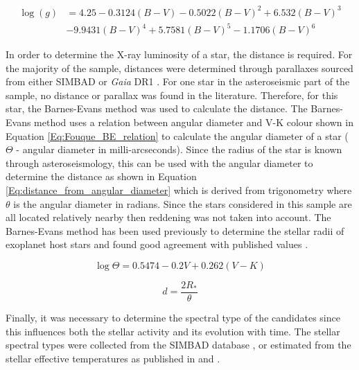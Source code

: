 \begin{equation}
    \begin{aligned}
    \log(g) & = 4.25 - 0.3124(B-V) - 0.5022(B-V)^{2} + 6.532(B-V)^{3} \\
    &- 9.9431(B-V)^{4} + 5.7581(B-V)^{5} - 1.1706(B-V)^{6}
    \label{Eq:Gray_2005}
    \end{aligned}
\end{equation}

In order to determine the X-ray luminosity of a star, the distance is required. For the majority of the sample, distances were determined through parallaxes sourced from either SIMBAD \citep{Wenger_etal_2000} or \textit{Gaia} DR1 \citep{Gaia_Collaboration_2016_DR1}. For one star in the asteroseismic part of the sample, no distance or parallax was found in the literature. Therefore, for this star, the Barnes-Evans method was used to calculate the distance. The Barnes-Evans method uses a relation between angular diameter and V-K colour \citep{Fouque_Gieren_1997} shown in Equation \ref{Eq:Fouque_BE_relation} to calculate the angular diameter of a star ($\Theta$ - angular diameter in milli-arcseconds). Since the radius of the star is known through asteroseismology, this can be used with the angular diameter to determine the distance as shown in Equation \ref{Eq:distance_from_angular_diameter} which is derived from trigonometry where $\theta$ is the angular diameter in radians. Since the stars considered in this sample are all located relatively nearby then reddening was not taken into account. The Barnes-Evans method has been used previously to determine the stellar radii of exoplanet host stars and found good agreement with published values \citep{Watson_etal_2010}.

\begin{equation}
    \log\Theta = 0.5474 - 0.2V + 0.262(V-K)
    \label{Eq:Fouque_BE_relation}
\end{equation}

\begin{equation}
    d = \frac{2R_{*}}{\theta}
    \label{Eq:distance_from_angular_diameter}
\end{equation}

Finally, it was necessary to determine the spectral type of the candidates since this influences both the stellar activity and its evolution with time. The stellar spectral types were collected from the SIMBAD database \citep{Wenger_etal_2000}, or estimated from the stellar effective temperatures as published in \citet{Chaplin_etal_2014} and \citet{Silva_Aguirre_etal_2015}.

